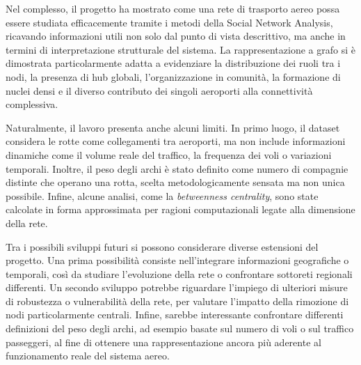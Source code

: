Nel complesso, il progetto ha mostrato come una rete di trasporto aereo possa essere studiata efficacemente tramite i metodi della Social Network Analysis, ricavando informazioni utili non solo dal punto di vista descrittivo, ma anche in termini di interpretazione strutturale del sistema. La rappresentazione a grafo si è dimostrata particolarmente adatta a evidenziare la distribuzione dei ruoli tra i nodi, la presenza di hub globali, l’organizzazione in comunità, la formazione di nuclei densi e il diverso contributo dei singoli aeroporti alla connettività complessiva.

Naturalmente, il lavoro presenta anche alcuni limiti. In primo luogo, il dataset considera le rotte come collegamenti tra aeroporti, ma non include informazioni dinamiche come il volume reale del traffico, la frequenza dei voli o variazioni temporali. Inoltre, il peso degli archi è stato definito come numero di compagnie distinte che operano una rotta, scelta metodologicamente sensata ma non unica possibile. Infine, alcune analisi, come la \textit{betweenness centrality}, sono state calcolate in forma approssimata per ragioni computazionali legate alla dimensione della rete.

Tra i possibili sviluppi futuri si possono considerare diverse estensioni del progetto. Una prima possibilità consiste nell’integrare informazioni geografiche o temporali, così da studiare l’evoluzione della rete o confrontare sottoreti regionali differenti. Un secondo sviluppo potrebbe riguardare l’impiego di ulteriori misure di robustezza o vulnerabilità della rete, per valutare l’impatto della rimozione di nodi particolarmente centrali. Infine, sarebbe interessante confrontare differenti definizioni del peso degli archi, ad esempio basate sul numero di voli o sul traffico passeggeri, al fine di ottenere una rappresentazione ancora più aderente al funzionamento reale del sistema aereo.
